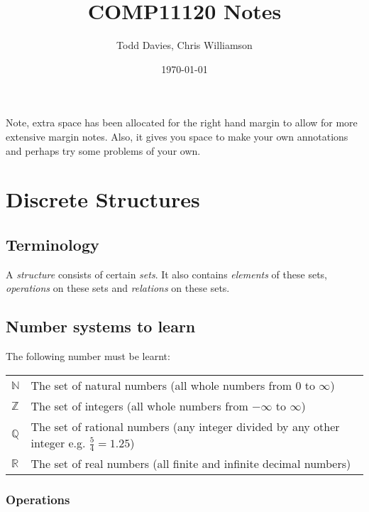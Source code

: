 \documentclass{article}
\author{Todd Davies, Chris Williamson}
\title{COMP11120 Notes}
\date{\today}
\begin{document}
\lhead{\today}

\maketitle

{\small Note, extra space has been allocated for the right hand margin to allow
for more extensive margin notes. Also, it gives you space to make your own
annotations and perhaps try some problems of your own.}

\tableofcontents
\newpage

\section{Discrete Structures}

\subsection{Terminology}

A {\it structure} consists of certain {\it sets}. It also contains {\it elements} of these sets, {\it operations} on these sets and {\it relations} on these sets.

\subsection{Number systems to learn}

The following number must be learnt:

\begin{tabularx}{\textwidth}{l X}
	$\mathbb{N}$ & The set of natural numbers (all whole numbers from $0$ to $\infty$)\\

	$\mathbb{Z}$ & The set of integers (all whole numbers from $-\infty$ to $\infty$)\\

	$\mathbb{Q}$ & The set of rational numbers (any integer divided by any other integer e.g. $\frac{5}{4}=1.25$)\\

	$\mathbb{R}$ & The set of real numbers (all finite and infinite decimal numbers)\\
\end{tabularx}

\subsubsection{Operations}
\end{document}
